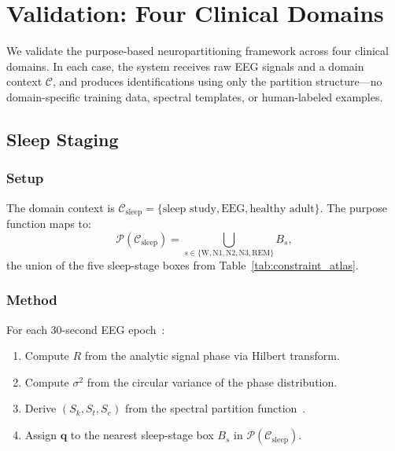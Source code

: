 \documentclass[aps,prd,twocolumn,superscriptaddress,floatfix,nofootinbib]{revtex4-2}
\theoremstyle{remark}
\newcommand{\Sk}{S_k}
\newcommand{\St}{S_t}
\newcommand{\Se}{S_e}
\newcommand{\qvec}{\mathbf{q}}
\newcommand{\Purpose}{\mathcal{P}}
\newcommand{\Context}{\mathcal{C}}
\begin{document}
\section{Validation: Four Clinical Domains}
\label{sec:validation}

We validate the purpose-based neuropartitioning framework across four clinical domains.
In each case, the system receives raw EEG signals and a domain context $\Context$, and produces identifications using only the partition structure---no domain-specific training data, spectral templates, or human-labeled examples.

\subsection{Sleep Staging}

\subsubsection{Setup}

The domain context is $\Context_{\mathrm{sleep}} = \{\text{sleep study}, \text{EEG}, \text{healthy adult}\}$.
The purpose function maps to:
\begin{equation}
\Purpose(\Context_{\mathrm{sleep}}) = \bigcup_{s \in \{\mathrm{W, N1, N2, N3, REM}\}} B_s,
\end{equation}
the union of the five sleep-stage boxes from Table~\ref{tab:constraint_atlas}.

\subsubsection{Method}

For each 30-second EEG epoch~\cite{berry2017aasm}:
\begin{enumerate}[noitemsep]
    \item Compute $R$ from the analytic signal phase via Hilbert transform.
    \item Compute $\sigma^2$ from the circular variance of the phase distribution.
    \item Derive $(\Sk, \St, \Se)$ from the spectral partition function~\cite{sachikonye2026operator}.
    \item Assign $\qvec$ to the nearest sleep-stage box $B_s$ in $\Purpose(\Context_{\mathrm{sleep}})$.
\end{enumerate}
\end{document}
